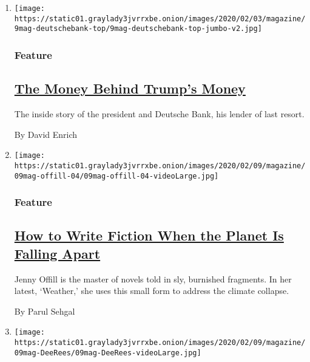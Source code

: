 \begin{enumerate}
\def\labelenumi{\arabic{enumi}.}
\item
  \texttt{[image: https://static01.graylady3jvrrxbe.onion/images/2020/02/03/magazine/9mag-deutschebank-top/9mag-deutschebank-top-jumbo-v2.jpg]}

  \hypertarget{feature}{%
  \subsubsection{Feature}\label{feature}}

  \hypertarget{the-money-behind-trumps-money}{%
  \subsection{\texorpdfstring{\href{/2020/02/04/magazine/deutsche-bank-trump.html}{The
  Money Behind Trump's
  Money}}{The Money Behind Trump's Money}}\label{the-money-behind-trumps-money}}

  The inside story of the president and Deutsche Bank, his lender of
  last resort.

  By David Enrich
\item
  \texttt{[image: https://static01.graylady3jvrrxbe.onion/images/2020/02/09/magazine/09mag-offill-04/09mag-offill-04-videoLarge.jpg]}

  \hypertarget{feature-1}{%
  \subsubsection{Feature}\label{feature-1}}

  \hypertarget{how-to-write-fiction-when-the-planet-is-falling-apart}{%
  \subsection{\texorpdfstring{\href{/2020/02/05/magazine/jenny-offill-weather-book.html}{How
  to Write Fiction When the Planet Is Falling
  Apart}}{How to Write Fiction When the Planet Is Falling Apart}}\label{how-to-write-fiction-when-the-planet-is-falling-apart}}

  Jenny Offill is the master of novels told in sly, burnished fragments.
  In her latest, `Weather,' she uses this small form to address the
  climate collapse.

  By Parul Sehgal
\item
  \texttt{[image: https://static01.graylady3jvrrxbe.onion/images/2020/02/09/magazine/09mag-DeeRees/09mag-DeeRees-videoLarge.jpg]}


\end{enumerate}
